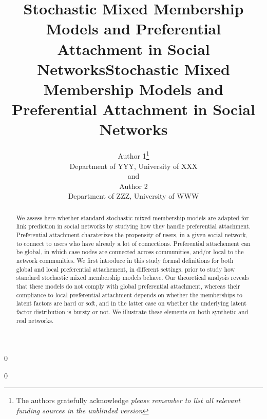 \documentclass[12pt]{article}
\newcommand{\blind}{0}
\begin{document}
\def\spacingset#1{\renewcommand{\baselinestretch}%
{#1}\small\normalsize} \spacingset{1}



\blind
{
  \title{\bf Stochastic Mixed Membership Models and Preferential Attachment in Social Networks}
  \author{Author 1\thanks{
    The authors gratefully acknowledge \textit{please remember to list all relevant funding sources in the unblinded version}}\hspace{.2cm}\\
    Department of YYY, University of XXX\\
    and \\
    Author 2 \\
    Department of ZZZ, University of WWW}
  \maketitle
} \fi

\blind
{
  \title{\bf Stochastic Mixed Membership Models and Preferential Attachment in Social Networks}
 \maketitle
} \fi

\bigskip
\begin{abstract}
We assess here whether standard stochastic mixed membership models are adapted for link prediction in social networks by studying how they handle preferential attachment. Preferential attachment charaterizes the propensity of users, in a given social network, to connect to users who have already a lot of connections. Preferential attachement can be global, in which case nodes are connected across communities, and/or local to the network communities. We first introduce in this study formal definitions for both global and local preferential attachement, in different settings, prior to study how standard stochastic mixed membership models behave. Our theoretical analysis reveals that these models do not comply with global preferential attachment, whereas their compliance to local preferential attachment depends on whether the memberships to latent factors are hard or soft, and in the latter case on whether the underlying latent factor distribution is bursty or not. We illustrate these elements on both synthetic and real networks.
\end{abstract}
\end{document}
